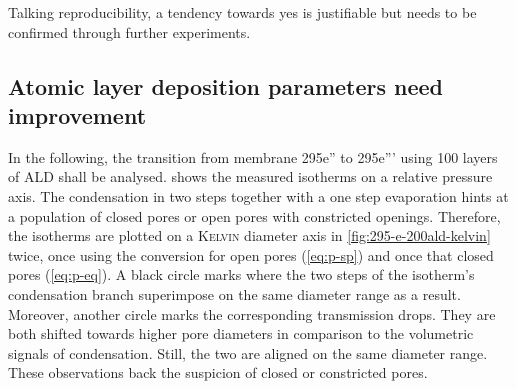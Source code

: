\documentclass[../thesis.tex]{subfiles}
\begin{document}
      Talking reproducibility, a tendency towards yes is justifiable but needs to be confirmed through further experiments.

      


      \subsection{Atomic layer deposition parameters need improvement}
      \label{parameters-need-improvement}

        

        In the following, the transition from membrane 295e'' to 295e''' using 100 layers of ALD shall be analysed.  shows the measured isotherms on a relative pressure axis. The condensation in two steps together with a one step evaporation hints at a population of closed pores or open pores with constricted openings. Therefore, the isotherms are plotted on a \textsc{Kelvin} diameter axis in \cref{fig:295-e-200ald-kelvin} twice, once using the conversion for open pores (\cref{eq:p-sp}) and once that closed pores (\cref{eq:p-eq}). A black circle marks where the two steps of the isotherm's condensation branch superimpose on the same diameter range as a result. Moreover, another circle marks the corresponding transmission drops. They are both shifted towards higher pore diameters in comparison to the volumetric signals of condensation. Still, the two are aligned on the same diameter range. These observations back the suspicion of closed or constricted pores.
        \medskip

        
\end{document}
